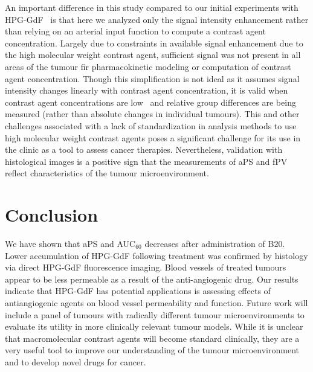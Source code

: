 An important difference in this study compared to our initial experiments with \acs{HPG-GdF}~\cite{Baker:2015cob} is that here we analyzed only the signal intensity enhancement rather than relying on an arterial input function to compute a contrast agent concentration.
Largely due to constraints in available signal enhancement due to the high molecular weight contrast agent, sufficient signal was not present in all areas of the tumour fir pharmacokinetic modeling or computation of contrast agent concentration.
Though this simplification is not ideal as it assumes signal intensity changes linearly with contrast agent concentration, it is valid when contrast agent concentrations are low~\cite{Heilmann:2006bm} and relative group differences are being measured (rather than absolute changes in individual tumours).
This and other challenges associated with a lack of standardization in analysis methods to use high molecular weight contrast agents poses a significant challenge for its use in the clinic as a tool to assess cancer therapies. 
Nevertheless, validation with histological images is a positive sign that the measurements of \acs{aPS} and \acs{fPV} reflect characteristics of the tumour microenvironment.

\section{Conclusion}

We have shown that \acs{aPS} and \acs{AUC}$_{60}$ decreases after administration of B20.
Lower accumulation of \acs{HPG-GdF} following treatment was confirmed by histology via direct \acs{HPG-GdF} fluorescence imaging.
Blood vessels of treated tumours appear to be less permeable as a result of the anti-angiogenic drug.
Our results indicate that \acs{HPG-GdF} has potential applications is assessing effects of antiangiogenic agents on blood vessel permeability and function.
Future work will include a panel of tumours with radically different tumour microenvironments to evaluate its utility in more clinically relevant tumour models.
While it is unclear that macromolecular contrast agents will become standard clinically, they are a very useful tool to improve our understanding of the tumour microenvironment and to develop novel drugs for cancer.
\endinput